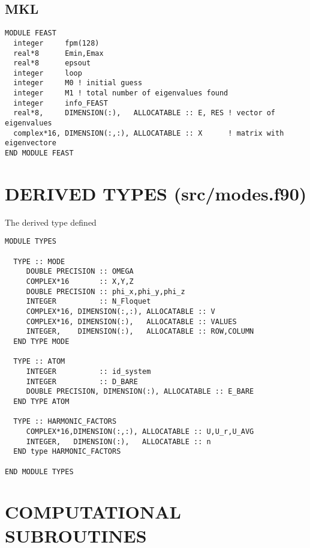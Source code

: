 \documentclass[10pt,a4paper]{article}
\begin{document}
\subsection{MKL}

\begin{verbatim}
MODULE FEAST
  integer     fpm(128)
  real*8      Emin,Emax
  real*8      epsout
  integer     loop
  integer     M0 ! initial guess 
  integer     M1 ! total number of eigenvalues found
  integer     info_FEAST
  real*8,     DIMENSION(:),   ALLOCATABLE :: E, RES ! vector of eigenvalues
  complex*16, DIMENSION(:,:), ALLOCATABLE :: X      ! matrix with eigenvectore
END MODULE FEAST
\end{verbatim}
\newpage
\section{DERIVED TYPES (src/modes.f90)}
\label{sec:derivedtypes}
The derived type defined 
\begin{verbatim}
MODULE TYPES

  TYPE :: MODE
     DOUBLE PRECISION :: OMEGA
     COMPLEX*16       :: X,Y,Z
     DOUBLE PRECISION :: phi_x,phi_y,phi_z
     INTEGER          :: N_Floquet
     COMPLEX*16, DIMENSION(:,:), ALLOCATABLE :: V
     COMPLEX*16, DIMENSION(:),   ALLOCATABLE :: VALUES
     INTEGER,    DIMENSION(:),   ALLOCATABLE :: ROW,COLUMN
  END TYPE MODE
  
  TYPE :: ATOM
     INTEGER          :: id_system
     INTEGER          :: D_BARE
     DOUBLE PRECISION, DIMENSION(:), ALLOCATABLE :: E_BARE
  END TYPE ATOM

  TYPE :: HARMONIC_FACTORS
     COMPLEX*16,DIMENSION(:,:), ALLOCATABLE :: U,U_r,U_AVG
     INTEGER,   DIMENSION(:),   ALLOCATABLE :: n
  END type HARMONIC_FACTORS

END MODULE TYPES
\end{verbatim}
\newpage
\section{COMPUTATIONAL SUBROUTINES}
\end{document}
